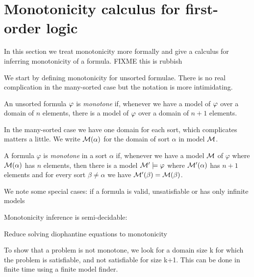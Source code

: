 \section{Monotonicity calculus for first-order logic}

\label{sec_monotonicity}

In this section we treat monotonicity more formally and give a
calculus for inferring monotonicity of a formula. FIXME this is
rubbish

We start by defining monotonicity for unsorted formulae. There is no
real complication in the many-sorted case but the notation is more
intimidating.

\begin{definition}
An unsorted formula $\varphi$ is \emph{monotone} if,
whenever we have a model of $\varphi$ over a domain of $n$ elements,
there is a model of $\varphi$ over a domain of $n+1$ elements.
\end{definition}

In the many-sorted case we have one domain for each sort, which
complicates matters a little. We write $\mathcal{M}(\alpha)$ for the domain of
sort $\alpha$ in model $\mathcal{M}$.

\begin{definition}
A formula $\varphi$ is \emph{monotone} in a sort $\alpha$ if,
whenever we have a model $\mathcal{M}$ of $\varphi$ where $\mathcal{M}(\alpha)$ has $n$
elements, then there is a model $\mathcal{M}' \models \varphi$ where
$\mathcal{M}'(\alpha)$ has $n+1$ elements and for every sort $\beta \neq
\alpha$ we have $\mathcal{M}'(\beta) = \mathcal{M}(\beta)$.
\end{definition}

We note some special cases: if a formula is valid, unsatisfiable or
has only infinite models





Monotonicity inference is semi-decidable:

Reduce solving diophantine equations to monotonicity

To show that a problem is not monotone, we look for a domain size
k for which the problem is satisfiable, and not satisfiable for size k+1.
This can be done in finite time using a finite model finder.



